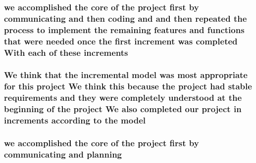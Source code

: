 \subsubsection[{\texorpdfstring{increments}{increments}}]{\setlength{\rightskip}{0pt plus 5cm}we accomplished the core of the project first by communicating and then coding and and then repeated the process to implement the remaining features and functions that were needed once the first increment was completed With each of these increments}\hypertarget{process-model_8txt_aa72783f12faaa2e4a8dd5489f27105e3}{}\label{process-model_8txt_aa72783f12faaa2e4a8dd5489f27105e3}
\subsubsection[{\texorpdfstring{model}{model}}]{\setlength{\rightskip}{0pt plus 5cm}We think that the incremental model was most appropriate for this project We think this because the project had stable requirements and they were completely understood at the beginning of the project We also completed our project in {\bf increments} according to the model}\hypertarget{process-model_8txt_a513e8e85a7bcfad5ea4f0f97e40c05cb}{}\label{process-model_8txt_a513e8e85a7bcfad5ea4f0f97e40c05cb}
\subsubsection[{\texorpdfstring{planning}{planning}}]{\setlength{\rightskip}{0pt plus 5cm}we accomplished the core of the project first by communicating and planning}\hypertarget{process-model_8txt_a0e86255a3b931936544f6d40f758abca}{}\label{process-model_8txt_a0e86255a3b931936544f6d40f758abca}

